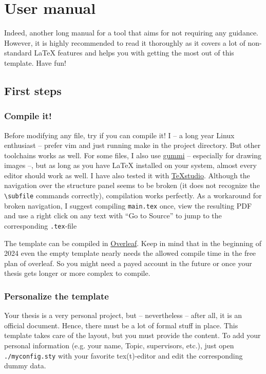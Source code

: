 \documentclass[../main.tex]{subfiles}
\begin{document}
\chapter{User manual}

Indeed, another long manual for a tool \cite{Bithappens16Template} that aims for not requiring any guidance.
However, it is highly recommended to read it thoroughly as it covers a lot of non-standard LaTeX features and helps you with getting the most out of this template.
Have fun!

\section{First steps}

\subsection{Compile it!}

Before modifying any file, try if you can compile it!
I -- a long year Linux enthusiast -- prefer vim and just running make in the project directory.
But other toolchains works as well.
For some files, I also use \href{https://github.com/alexandervdm/gummi}{gummi} -- especially for drawing images --, but as long as you have LaTeX installed on your system, almost every editor should work as well.
I have also tested it with \href{http://www.texstudio.org/}{TeXstudio}.
Although the navigation over the structure panel seems to be broken (it does not recognize the \texttt{\textbackslash subfile} commands correctly), compilation works perfectly.
As a workaround for broken navigation, I suggest compiling \texttt{main.tex} once, view the resulting PDF and use a right click on any text with \enquote{Go to Source} to jump to the corresponding \texttt{.tex}-file

The template can be compiled in \href{https://www.overleaf.com/}{Overleaf}. Keep in mind that in the beginning of 2024 even the empty template nearly needs the allowed compile time in the free plan of overleaf. So you might need a payed account in the future or once your thesis gets longer or more complex to compile.

\subsection{Personalize the template}

Your thesis is a very personal project, but -- nevertheless -- after all, it is an official document.
Hence, there must be a lot of formal stuff in place.
This template takes care of the layout, but you must provide the content.
To add your personal information (e.g. your name, Topic, supervisors, etc.), just open \texttt{./myconfig.sty} with your favorite tex(t)-editor and edit the corresponding dummy data.
\end{document}
